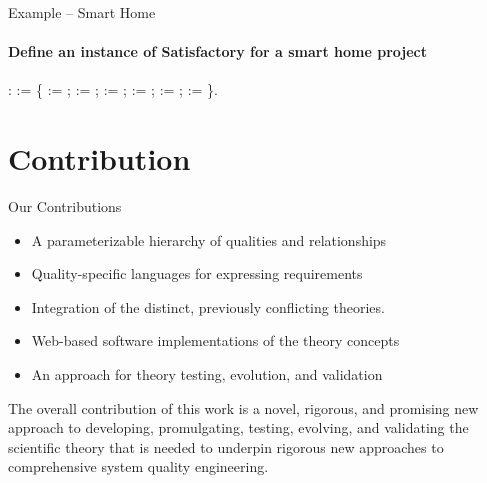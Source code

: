 \documentclass[xcolor=x11names,compress]{beamer}
\renewcommand{\(}{\begin{columns}}
\renewcommand{\)}{\end{columns}}
\newcommand{\<}[1]{\begin{column}{#1}}
\renewcommand{\>}{\end{column}}
\begin{document}
\begin{frame}{Example -- Smart Home}
\framesubtitle{Define an instance of Satisfactory for a smart home project}
\begin{coqdoccode}
\small{
\coqdocnoindent
{} :     := \{\coqdoceol
\coqdocindent{2.00em}
 :=  \coqdoceol
\coqdocnoindent
\coqdoceol
\coqdocindent{1.00em}
;  := \coqdoceol
\coqdocindent{1.00em}
;  := \coqdoceol
\coqdocindent{1.00em}
;  := \coqdoceol
\coqdocindent{1.00em}
\coqdoceol
\coqdocindent{1.00em}
;  := \coqdoceol
\coqdocindent{1.00em}
;  := \coqdoceol
\coqdocnoindent
\}.\coqdoceol
}
\end{coqdoccode}
\end{frame}


\section{Contribution}
\begin{frame}{Our Contributions}
\begin{itemize}
		\item A parameterizable hierarchy of qualities and relationships
		\item Quality-specific languages for expressing  requirements
		\item Integration of the distinct, previously conflicting theories.
		\item Web-based software implementations of the theory concepts
		\item An approach for theory testing, evolution, and validation
\end{itemize}
\vspace{0.5cm}		
		The overall contribution of this work is a novel, rigorous, and promising new approach to developing, promulgating, testing, evolving, and validating the scientific theory that is needed to underpin rigorous new approaches to comprehensive system quality engineering.
\end{frame}
\end{document}
